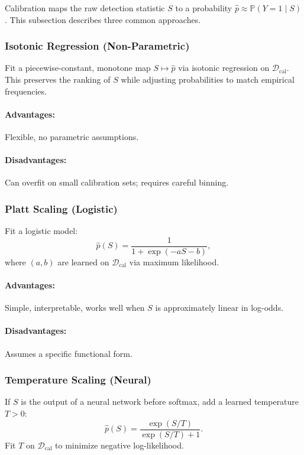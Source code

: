 \documentclass[11pt]{article}
\theoremstyle{remark}
\theoremstyle{plain}
\begin{document}
Calibration maps the raw detection statistic $S$ to a probability $\hat p \approx \mathbb{P}(Y=1 \mid S)$. This subsection describes three common approaches.

\subsubsection{Isotonic Regression (Non-Parametric)}

Fit a piecewise-constant, monotone map $S \mapsto \hat p$ via isotonic regression on $\mathcal{D}_{\mathrm{cal}}$. This preserves the ranking of $S$ while adjusting probabilities to match empirical frequencies.

\paragraph{Advantages:} Flexible, no parametric assumptions.

\paragraph{Disadvantages:} Can overfit on small calibration sets; requires careful binning.

\subsubsection{Platt Scaling (Logistic)}

Fit a logistic model:
\[
\hat p(S) = \frac{1}{1 + \exp(-a S - b)},
\]
where $(a,b)$ are learned on $\mathcal{D}_{\mathrm{cal}}$ via maximum likelihood.

\paragraph{Advantages:} Simple, interpretable, works well when $S$ is approximately linear in log-odds.

\paragraph{Disadvantages:} Assumes a specific functional form.

\subsubsection{Temperature Scaling (Neural)}

If $S$ is the output of a neural network before softmax, add a learned temperature $T>0$:
\[
\hat p(S) = \frac{\exp(S/T)}{\exp(S/T) + 1}.
\]
Fit $T$ on $\mathcal{D}_{\mathrm{cal}}$ to minimize negative log-likelihood.
\end{document}
